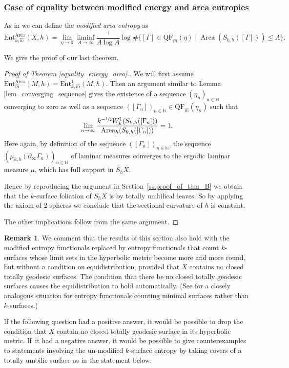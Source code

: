 \documentclass[11pt]{article}
\newcommand{\ksurface}{$k$\nobreakdash-surface\xspace}
\newcommand{\ksurfaces}{$k$\nobreakdash-surfaces\xspace}
\theoremstyle{plain}
\theoremstyle{definition}
\newtheorem{remark}[theorem]{Remark}
\newcommand{\Ent}{\mathrm{Ent}}
\newcommand{\QF}{\mathrm{QF}}
\newcommand{\bord}{\partial_{\infty}}
\DeclareMathOperator{\Area}{Area}
\begin{document}
\subsubsection{Case of equality between modified energy and area entropies} \label{sss.equality_modified_entropies}

As in \cite{ALS,MN_currents} we can define the \emph{modified area entropy} as
\begin{equation*}
\Ent^{\Area}_{k,\hat m}(X,h)=\lim_{\eta\to 0}\liminf_{A\to\infty}\frac{1}{A\log A}\log\#\bigl\{[\Gamma]\in\QF_{\hat m}(\eta)\mid \Area(S_{k,h}([\Gamma]))\leq A\bigr\}.
\end{equation*}

We give the proof of our last theorem.

\begin{proof}[Proof of Theorem \ref{equality_energy_area}.]
We will first assume $\Ent^{\Area}_{\hat m}(M,h)=\Ent^{1}_{k,\hat m}(M,h)$. Then an argument similar to Lemma \ref{lem_converging_sequence} gives the existence of a sequence $(\eta_n)_{n\in\mathbb{N}}$ converging to zero as well as a sequence $([\Gamma_n])_{n\in\mathbb{N}}\in\QF_{\hat m}(\eta_n)$ such that
\begin{equation*}
\lim_{n\to\infty}\frac{k^{-\sfrac{1}{2}}W^{1}_{h}(S_{k,h}([\Gamma_n]))}{\Area_h(S_{k,h}([\Gamma_n]))}=1.
\end{equation*}
Here again, by definition of the sequence $([\Gamma_n])_{n\in\mathbb{N}}$, the sequence $(\mu_{k,h}(\bord \Gamma_n))_{n\in\mathbb{N}}$ of laminar measures converges to the ergodic laminar measure $\mu$, which has full support in $S_hX$.

Hence by reproducing the argument in Section~\ref{ss.proof_of_thm_B} we obtain that the \ksurface foliation of $S_hX$ is by totally umbilical leaves. So by applying the axiom of $2$-spheres we conclude that the sectional curvature of $h$ is constant.

The other implications follow from the same argument.
\end{proof}

\begin{remark} \label{remarkattheend}
We comment that the results of this section also hold with the modified entropy functionals replaced by entropy functionals that count \ksurfaces whose limit sets in the hyperbolic metric become more and more round, but without a condition on equidistribution, provided that $X$ contains no closed totally geodesic surfaces. The condition that there be no closed totally geodesic surfaces causes the equidistribution to hold automatically. (See \cite{MN_currents} for a closely analogous situation for entropy functionals counting minimal surfaces rather than \ksurfaces.)

If the following question had a positive answer, it would be possible to drop the condition that $X$ contain no closed totally geodesic surface in its hyperbolic metric. If~it had a negative answer, it would be possible to give counterexamples to statements involving the un-modified \ksurface entropy by taking covers of a totally umbilic surface as in the statement below.
\end{remark}
\end{document}
